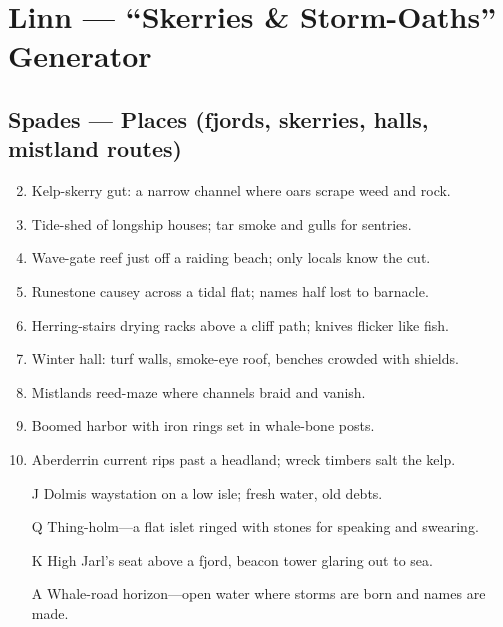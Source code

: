 \chapter{Linn --- ``Skerries \& Storm-Oaths'' Generator}

\section*{Spades --- Places (fjords, skerries, halls, mistland routes)}
\begin{enumerate}
\setcounter{enumi}{1}
\item Kelp-skerry gut: a narrow channel where oars scrape weed and rock.
\item Tide-shed of longship houses; tar smoke and gulls for sentries.
\item Wave-gate reef just off a raiding beach; only locals know the cut.
\item Runestone causey across a tidal flat; names half lost to barnacle.
\item Herring-stairs drying racks above a cliff path; knives flicker like fish.
\item Winter hall: turf walls, smoke-eye roof, benches crowded with shields.
\item Mistlands reed-maze where channels braid and vanish.
\item Boomed harbor with iron rings set in whale-bone posts.
\item Aberderrin current rips past a headland; wreck timbers salt the kelp.
\item[J] Dolmis waystation on a low isle; fresh water, old debts.
\item[Q] Thing-holm---a flat islet ringed with stones for speaking and swearing.
\item[K] High Jarl's seat above a fjord, beacon tower glaring out to sea.
\item[A] Whale-road horizon---open water where storms are born and names are made.
\end{enumerate}

